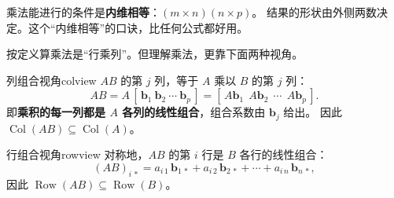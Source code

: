 \documentclass[11pt,a4paper,openany]{ctexbook}
\DeclareMathOperator{\Col}{Col}
\DeclareMathOperator{\Row}{Row}
\begin{document}
\begin{keypoint}
乘法能进行的条件是\textbf{内维相等}：$(m\times n)(n\times p)$。
结果的形状由外侧两数决定。这个“内维相等”的口诀，比任何公式都好用。
\end{keypoint}

按定义算乘法是“行乘列”。但理解乘法，更靠下面两种视角。

\begin{prop}{列组合视角}{colview}
$AB$ 的第 $j$ 列，等于 $A$ 乘以 $B$ 的第 $j$ 列：
\[
AB=A\,[\,\boldsymbol{b}_1\ \boldsymbol{b}_2\ \cdots\ \boldsymbol{b}_p\,]
=[\,A\boldsymbol{b}_1\ \ A\boldsymbol{b}_2\ \ \cdots\ \ A\boldsymbol{b}_p\,].
\]
即\textbf{乘积的每一列都是 $A$ 各列的线性组合}，组合系数由 $\boldsymbol{b}_j$ 给出。
因此 $\Col(AB)\subseteq \Col(A)$。
\end{prop}

\begin{prop}{行组合视角}{rowview}
对称地，$AB$ 的第 $i$ 行是 $B$ 各行的线性组合：
\[
(AB)_{i\,*}=a_{i\,1}\,\boldsymbol{b}_{1\,*}+a_{i\,2}\,\boldsymbol{b}_{2\,*}+\cdots
+a_{i\,n}\,\boldsymbol{b}_{n\,*},
\]
因此 $\Row(AB)\subseteq \Row(B)$。
\end{prop}
\end{document}
